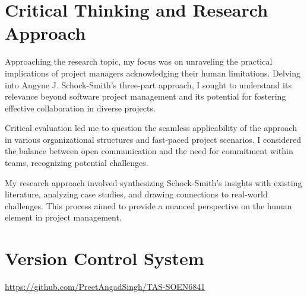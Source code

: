 \documentclass[11pt]{article}
\begin{document}
\section{Critical Thinking and Research Approach}

Approaching the research topic, my focus was on unraveling the practical implications of project managers acknowledging their human limitations. Delving into Angyne J. Schock-Smith's three-part approach, I sought to understand its relevance beyond software project management and its potential for fostering effective collaboration in diverse projects.

Critical evaluation led me to question the seamless applicability of the approach in various organizational structures and fast-paced project scenarios. I considered the balance between open communication and the need for commitment within teams, recognizing potential challenges.

My research approach involved synthesizing Schock-Smith's insights with existing literature, analyzing case studies, and drawing connections to real-world challenges. This process aimed to provide a nuanced perspective on the human element in project management.

\section{Version Control System}
{\href{https://github.com/PreetAngadSingh/TAS-SOEN6841}{https://github.com/PreetAngadSingh/TAS-SOEN6841}}
\end{document}
